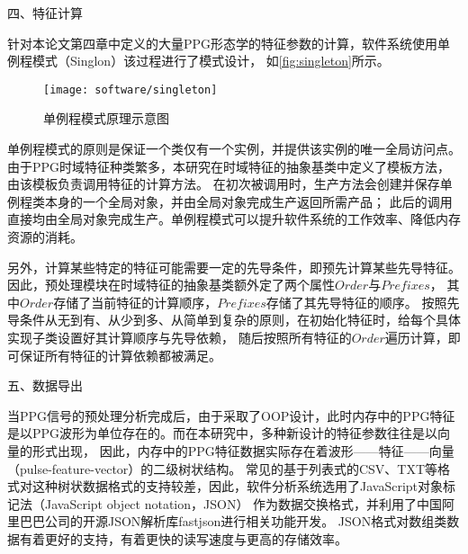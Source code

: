 四、特征计算

针对本论文第四章中定义的大量PPG形态学的特征参数的计算，软件系统使用单例程模式（Singlon）该过程进行了模式设计\cite{Enrich2018}，
如\autoref{fig:singleton}所示。

\begin{figure}[htbp]
    \centering
    \texttt{[image: software/singleton]}
    \caption{\label{fig:singleton}单例程模式原理示意图}
\end{figure}

单例程模式的原则是保证一个类仅有一个实例，并提供该实例的唯一全局访问点。
由于PPG时域特征种类繁多，本研究在时域特征的抽象基类中定义了模板方法，
由该模板负责调用特征的计算方法。
在初次被调用时，生产方法会创建并保存单例程类本身的一个全局对象，并由全局对象完成生产返回所需产品；
此后的调用直接均由全局对象完成生产。单例程模式可以提升软件系统的工作效率、降低内存资源的消耗。

另外，计算某些特定的特征可能需要一定的先导条件，即预先计算某些先导特征。因此，预处理模块在时域特征的抽象基类额外定了两个属性$Order$与$Prefixes$，
其中$Order$存储了当前特征的计算顺序，$Prefixes$存储了其先导特征的顺序。
按照先导条件从无到有、从少到多、从简单到复杂的原则，在初始化特征时，给每个具体实现子类设置好其计算顺序与先导依赖，
随后按照所有特征的$Order$遍历计算，即可保证所有特征的计算依赖都被满足。

五、数据导出

当PPG信号的预处理分析完成后，由于采取了OOP设计，此时内存中的PPG特征是以PPG波形为单位存在的。而在本研究中，多种新设计的特征参数往往是以向量的形式出现，
因此，内存中的PPG特征数据实际存在着波形——特征——向量（pulse-feature-vector）的二级树状结构。
常见的基于列表式的CSV、TXT等格式对这种树状数据格式的支持较差，因此，软件分析系统选用了JavaScript对象标记法（JavaScript object notation，JSON）\cite{json}
作为数据交换格式，并利用了中国阿里巴巴公司的开源JSON解析库fastjson\cite{fastjson}进行相关功能开发。
JSON格式对数组类数据有着更好的支持，有着更快的读写速度与更高的存储效率。



